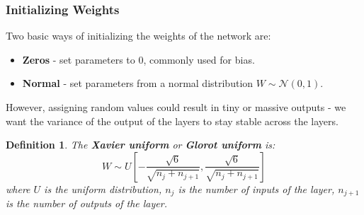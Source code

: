 \documentclass[11pt]{article}
\newtheorem{defn}{Definition}
\begin{document}
\subsubsection{Initializing Weights}
Two basic ways of initializing the weights of the network are:
\begin{itemize}
  \item \textbf{Zeros} - set parameters to $0$, commonly used for bias.
  \item \textbf{Normal} - set parameters from a normal distribution $W \sim \mathcal{N}(0, 1)$.
\end{itemize}

However, assigning random values could result in tiny or massive outputs - we want the variance of the output of the layers to stay stable across the layers.
\begin{defn}
  The \textbf{Xavier uniform} or \textbf{Glorot uniform} is:
  \[
    W \sim U \left[ -\frac{\sqrt{6}}{\sqrt{n_j + n_{j + 1}}}, \frac{\sqrt{6}}{\sqrt{n_j + n_{j + 1}}}\right] 
  \]
  where $U$ is the uniform distribution, $n_j$ is the number of inputs of the layer, $n_{j + 1}$ is the number of outputs of the layer.
\end{defn}
\end{document}
